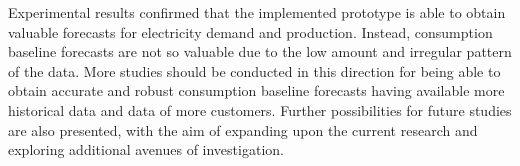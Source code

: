 Experimental results confirmed that the implemented prototype is able to obtain valuable forecasts for electricity demand and production.
Instead, consumption baseline forecasts are not so valuable due to the low amount and irregular pattern of the data.
More studies should be conducted in this direction for being able to obtain accurate and robust consumption baseline forecasts having available more historical data and data of more customers.
Further possibilities for future studies are also presented, with the aim of expanding upon the current research and exploring additional avenues of investigation.
